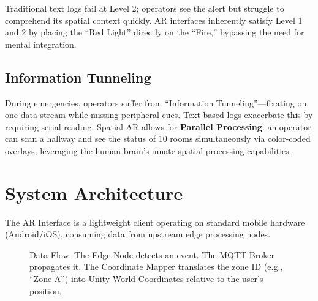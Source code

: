 \documentclass[conference]{IEEEtran}
\begin{document}
Traditional text logs fail at Level 2; operators see the alert but struggle to comprehend its spatial context quickly. AR interfaces inherently satisfy Level 1 and 2 by placing the ``Red Light'' directly on the ``Fire,'' bypassing the need for mental integration.

\subsection{Information Tunneling}
During emergencies, operators suffer from ``Information Tunneling''---fixating on one data stream while missing peripheral cues. Text-based logs exacerbate this by requiring serial reading. Spatial AR allows for \textbf{Parallel Processing}: an operator can scan a hallway and see the status of 10 rooms simultaneously via color-coded overlays, leveraging the human brain's innate spatial processing capabilities.

\section{System Architecture}

The AR Interface is a lightweight client operating on standard mobile hardware (Android/iOS), consuming data from upstream edge processing nodes.



\begin{figure}[htbp]
\centering
{}
\caption{Data Flow: The Edge Node detects an event. The MQTT Broker propagates it. The Coordinate Mapper translates the zone ID (e.g., ``Zone-A'') into Unity World Coordinates relative to the user's position.}
\label{fig:arch}
\end{figure}
\end{document}
